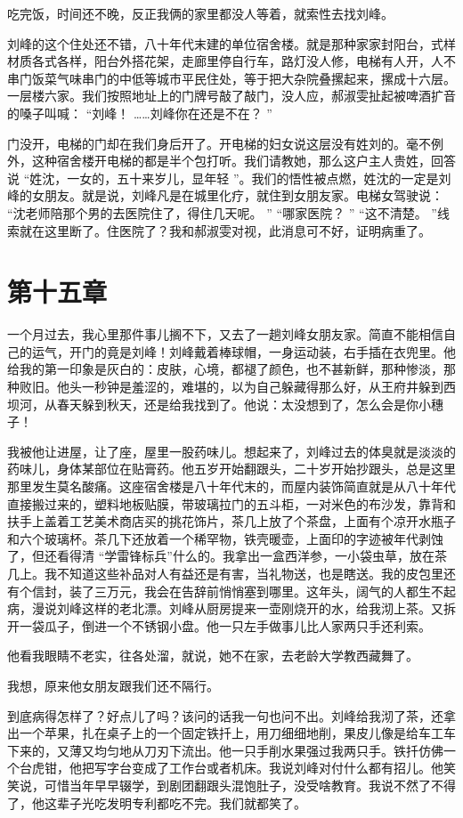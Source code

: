 \documentclass[12pt,twoside,openany]{book}
\begin{document}
吃完饭，时间还不晚，反正我俩的家里都没人等着，就索性去找刘峰。

刘峰的这个住处还不错，八十年代末建的单位宿舍楼。就是那种家家封阳台，式样材质各式各样，阳台外搭花架，走廊里停自行车，路灯没人修，电梯有人开，人不串门饭菜气味串门的中低等城市平民住处，等于把大杂院叠摞起来，摞成十六层。一层楼六家。我们按照地址上的门牌号敲了敲门，没人应，郝淑雯扯起被啤酒扩音的嗓子叫喊： “刘峰！ ……刘峰你在还是不在？ ”

门没开，电梯的门却在我们身后开了。开电梯的妇女说这层没有姓刘的。毫不例外，这种宿舍楼开电梯的都是半个包打听。我们请教她，那么这户主人贵姓，回答说 “姓沈，一女的，五十来岁儿，显年轻 ”。我们的悟性被点燃，姓沈的一定是刘峰的女朋友。就是说，刘峰凡是在城里化疗，就住到女朋友家。电梯女驾驶说： “沈老师陪那个男的去医院住了，得住几天呢。 ” “哪家医院？ ” “这不清楚。 ”线索就在这里断了。住医院了？我和郝淑雯对视，此消息可不好，证明病重了。

\chapter{第十五章}

一个月过去，我心里那件事儿搁不下，又去了一趟刘峰女朋友家。简直不能相信自己的运气，开门的竟是刘峰！刘峰戴着棒球帽，一身运动装，右手插在衣兜里。他给我的第一印象是灰白的：皮肤，心境，都褪了颜色，也不甚新鲜，那种惨淡，那种败旧。他头一秒钟是羞涩的，难堪的，以为自己躲藏得那么好，从王府井躲到西坝河，从春天躲到秋天，还是给我找到了。他说：太没想到了，怎么会是你小穗子！

我被他让进屋，让了座，屋里一股药味儿。想起来了，刘峰过去的体臭就是淡淡的药味儿，身体某部位在贴膏药。他五岁开始翻跟头，二十岁开始抄跟头，总是这里那里发生莫名酸痛。这座宿舍楼是八十年代末的，而屋内装饰简直就是从八十年代直接搬过来的，塑料地板贴膜，带玻璃拉门的五斗柜，一对米色的布沙发，靠背和扶手上盖着工艺美术商店买的挑花饰片，茶几上放了个茶盘，上面有个凉开水瓶子和六个玻璃杯。茶几下还放着一个稀罕物，铁壳暖壶，上面印的字迹被年代剥蚀了，但还看得清 “学雷锋标兵”什么的。我拿出一盒西洋参，一小袋虫草，放在茶几上。我不知道这些补品对人有益还是有害，当礼物送，也是瞎送。我的皮包里还有个信封，装了三万元，我会在告辞前悄悄塞到哪里。这年头，阔气的人都生不起病，漫说刘峰这样的老北漂。刘峰从厨房提来一壶刚烧开的水，给我沏上茶。又拆开一袋瓜子，倒进一个不锈钢小盘。他一只左手做事儿比人家两只手还利索。

他看我眼睛不老实，往各处溜，就说，她不在家，去老龄大学教西藏舞了。

我想，原来他女朋友跟我们还不隔行。

到底病得怎样了？好点儿了吗？该问的话我一句也问不出。刘峰给我沏了茶，还拿出一个苹果，扎在桌子上的一个固定铁扦上，用刀细细地削，果皮儿像是给车工车下来的，又薄又均匀地从刀刃下流出。他一只手削水果强过我两只手。铁扦仿佛一个台虎钳，他把写字台变成了工作台或者机床。我说刘峰对付什么都有招儿。他笑笑说，可惜当年早早辍学，到剧团翻跟头混饱肚子，没受啥教育。我说不然了不得了，他这辈子光吃发明专利都吃不完。我们就都笑了。
\end{document}
